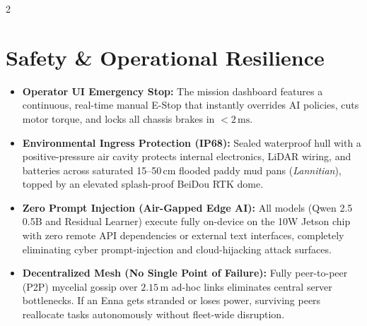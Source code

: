 \documentclass[9pt,a4paper]{article}
\begin{document}
\begin{multicols}{2}
\section{\textbf{Safety \& Operational Resilience}}
\begin{itemize}
    \item \textbf{Operator UI Emergency Stop:} The mission dashboard features a continuous, real-time manual E-Stop that instantly overrides AI policies, cuts motor torque, and locks all chassis brakes in $<2\,\text{ms}$.
    \item \textbf{Environmental Ingress Protection (IP68):} Sealed waterproof hull with a positive-pressure air cavity protects internal electronics, LiDAR wiring, and batteries across saturated 15--50\,cm flooded paddy mud pans (\textit{Lannitian}), topped by an elevated splash-proof BeiDou RTK dome.
    \item \textbf{Zero Prompt Injection (Air-Gapped Edge AI):} All models (Qwen 2.5 0.5B and Residual Learner) execute fully on-device on the 10W Jetson chip with zero remote API dependencies or external text interfaces, completely eliminating cyber prompt-injection and cloud-hijacking attack surfaces.
    \item \textbf{Decentralized Mesh (No Single Point of Failure):} Fully peer-to-peer (P2P) mycelial gossip over $2.15\,\text{m}$ ad-hoc links eliminates central server bottlenecks. If an Enna gets stranded or loses power, surviving peers reallocate tasks autonomously without fleet-wide disruption.
\end{itemize}

\end{multicols}
\end{document}
